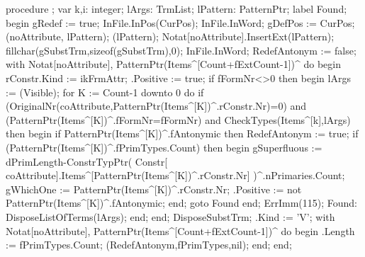 \nwenddocs{}\endmoddef\nwstartdeflinemarkup{}\nwenddeflinemarkup
procedure ;
var
   k,i: integer;
   lArgs: TrmList;
   lPattern: PatternPtr;
label Found;
begin
   gRedef := true;
   InFile.InPos(CurPos); InFile.InWord;
   gDefPos := CurPos;
   (noAttribute, lPattern);
   (lPattern);
   Notat[noAttribute].InsertExt(lPattern);
   fillchar(gSubstTrm,sizeof(gSubstTrm),0);
   InFile.InWord;
   RedefAntonym := false;
   with Notat[noAttribute], PatternPtr(Items^[Count+fExtCount-1])^ do
   begin
      rConstr.Kind := ikFrmAttr;
      .Positive := true;
      if fFormNr<>0 then
      begin
         lArgs := (Visible);
         for K := Count-1 downto 0 do
            if (OriginalNr(coAttribute,PatternPtr(Items^[K])^.rConstr.Nr)=0) and
                  (PatternPtr(Items^[K])^.fFormNr=fFormNr) and
                  CheckTypes(Items^[k],lArgs) then
            begin
               if PatternPtr(Items^[K])^.fAntonymic then RedefAntonym := true;
               if (PatternPtr(Items^[K])^.fPrimTypes.Count) then
               begin
                  gSuperfluous := dPrimLength-ConstrTypPtr(
                     Constr[ coAttribute].Items^[PatternPtr(Items^[K])^.rConstr.Nr]
                                                          )^.nPrimaries.Count;
                  gWhichOne := PatternPtr(Items^[K])^.rConstr.Nr;
                  .Positive := not PatternPtr(Items^[K])^.fAntonymic;
               end;
               goto Found
            end;
         ErrImm(115);
         Found:
            DisposeListOfTerms(lArgs);
      end;
   end;
   DisposeSubstTrm;
   .Kind := 'V';
   with Notat[noAttribute], PatternPtr(Items^[Count+fExtCount-1])^ do
   begin
      .Length := fPrimTypes.Count;
      (RedefAntonym,fPrimTypes,nil);
   end;
end;
\eatline
